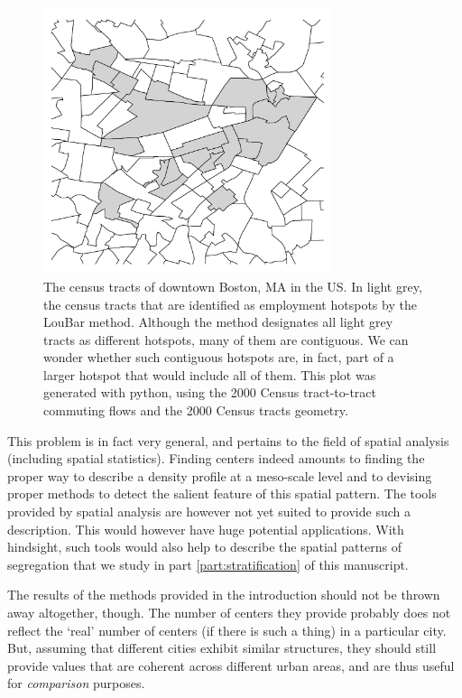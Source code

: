 \begin{figure}[!h]
    \centering
    \includegraphics[width=0.75\textwidth]{gfx/chapter-monocentric/hotspots_boston.pdf}
    \caption{The census tracts of downtown Boston, MA in the US. In light grey,
    the census tracts that are identified as employment hotspots by the LouBar
method. Although the method designates all light grey tracts as different hotspots,
many of them are contiguous. We can wonder whether such contiguous
hotspots are, in fact, part of a larger hotspot that would include all of them.
This plot was generated with python, using the 2000 Census tract-to-tract
commuting flows and the 2000 Census tracts geometry.\label{fig:hotspots_boston}}
\end{figure}

This problem is in fact very general, and pertains to the field of spatial
analysis (including spatial statistics). Finding centers indeed amounts to
finding the proper way to describe a density profile at a meso-scale level and
to devising proper methods to detect the salient feature of this spatial
pattern. The tools provided by spatial analysis are however not yet suited to
provide such a description. This would however have huge potential applications.
With hindsight, such tools would also help to describe the spatial patterns of
segregation that we study in part \ref{part:stratification} of this
manuscript.

The results of the methods provided in the introduction should not be thrown
away altogether, though. The number of centers they provide probably does not
reflect the `real' number of centers (if there is such a thing) in a particular
city. But, assuming that different cities exhibit similar structures, they
should still provide values that are coherent across different urban areas, and
are thus useful for \emph{comparison} purposes.\\


